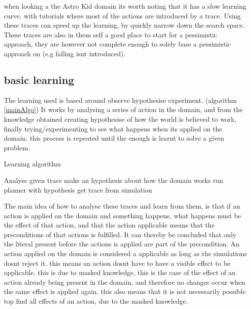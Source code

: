 	
	
	
	when looking a the Astro Kid domain its worth noting that it has a slow learning curve. with tutorials where most of the actions are introduced by a trace. Using these traces can speed up the learning, by quickly narrow down the search space. These traces are also in them self a good place to start for a pessimistic approach, they are however not complete enough to solely base a pessimistic approach on (e.g falling isnt introduced).




\subsection{basic learning}
	The learning used is based around observe hypothesise experiment. (algorithm \ref{mainAlgo}) It works by analysing a series of action in the domain, and from the knowledge obtained creating hypothesise of how the world is believed to work, finally trying/experimenting to see what happens when its applied on the domain. this process is repeated until the enough is learnt to solve a given problem.
	
	
	\begin{algorithm}
		\caption{Learning algorithm}
		\label{mainAlgo}
		\begin{algorithmic}[1]
			\State Analyse given trace
			\State make an hypothesis about how the domain works
			\State run planner with hypothesis
			\State get trace from simulation
			\EndWhile
			
		\end{algorithmic}
	\end{algorithm}	


	The main idea of how to analyse these traces and learn from them, is that if an action is applied on the domain and something happens, what happens must be the effect of that action, and that the action applicable means that the preconditions of that actions is fulfilled. It can thereby be concluded that only the literal present before the actions is applied are part of the precondition. An action applied on the domain is considered a applicable as long as the simulations dosnt reject it. this means an action dosnt have to have a visible effect to be applicable. this is due to masked knowledge, this is the case of the effect of an action already being present in the domain, and therefore no changes occur when the same effect is applied again. this also means that it is not necessarily possible top find all effects of an action, due to the masked knowledge.
	
